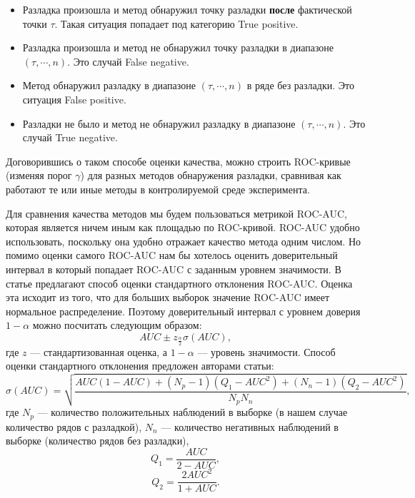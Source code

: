 \documentclass[%
12pt,
master,  %
natbib,      %
subf,        %
substylefile = spbu.rtx,
href,        %
colorlinks,  %
]{disser}
\begin{document}

\begin{itemize}
	\item Разладка произошла и метод обнаружил точку разладки \textbf{после} фактической точки $\tau$. Такая ситуация попадает под категорию True positive.
	\item Разладка произошла и метод не обнаружил точку разладки в диапазоне $(\tau, \cdots, n)$. Это случай False negative.
	\item Метод обнаружил разладку в диапазоне $(\tau, \cdots, n)$ в ряде без разладки. Это ситуация False positive.
	\item Разладки не было и метод не обнаружил разладку в диапазоне $(\tau, \cdots, n)$. Это случай True negative.
\end{itemize}


Договорившись о таком способе оценки качества, можно строить ROC-кривые (изменяя порог $\gamma$) для разных методов обнаружения разладки, сравнивая как работают те или иные методы в контролируемой среде эксперимента.

Для сравнения качества методов мы будем пользоваться метрикой ROC-AUC, которая является ничем иным как площадью по ROC-кривой. ROC-AUC удобно использовать, поскольку она удобно отражает качество метода одним числом. Но помимо оценки самого ROC-AUC нам бы хотелось оценить доверительный интервал в который попадает ROC-AUC с заданным уровнем значимости. В статье \cite{roc-confidence} предлагают способ оценки стандартного отклонения ROC-AUC. Оценка эта исходит из того, что для больших выборок значение ROC-AUC имеет нормальное распределение. Поэтому доверительный интервал с уровнем доверия $1 - \alpha$ можно посчитать следующим образом:
$$ AUC \pm z_{\frac{\alpha}{2}} \sigma(AUC), $$
где $z$ --- стандартизованная оценка, а $1 - \alpha$ --- уровень значимости.
Способ оценки стандартного отклонения предложен авторами статьи:
$$ \sigma(AUC) = \sqrt{\frac{AUC(1 - AUC) + (N_p - 1)(Q_1 - AUC^2) + (N_n-1)(Q_2 - AUC^2)}{N_pN_n}}, $$
где $N_p$ --- количество положительных наблюдений в выборке (в нашем случае количество рядов с разладкой), $N_n$ --- количество негативных наблюдений в выборке (количество рядов без разладки),
$$ Q_1 = \frac{AUC}{2 - AUC}, $$
$$ Q_2 = \frac{2AUC^2}{1 + AUC}. $$
\end{document}
